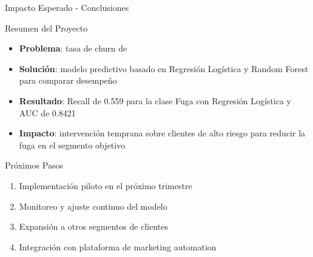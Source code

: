 \begin{frame}{Impacto Esperado - Conclusiones}
    \begin{block}{Resumen del Proyecto}
        \begin{itemize}
            \item \textbf{Problema}: tasa de churn de \churnrate
            \item \textbf{Solución}: modelo predictivo basado en Regresión Logística y Random Forest para comparar desempeño
            \item \textbf{Resultado}: Recall de 0.559 para la clase Fuga con Regresión Logística y AUC de 0.8421
            \item \textbf{Impacto}: intervención temprana sobre clientes de alto riesgo para reducir la fuga en el segmento objetivo
        \end{itemize}
    \end{block}
    
    \vsp
    \begin{exampleblock}{Próximos Pasos}
        \begin{enumerate}
            \item Implementación piloto en el próximo trimestre
            \item Monitoreo y ajuste continuo del modelo
            \item Expansión a otros segmentos de clientes
            \item Integración con plataforma de marketing automation
        \end{enumerate}
    \end{exampleblock}
\end{frame}